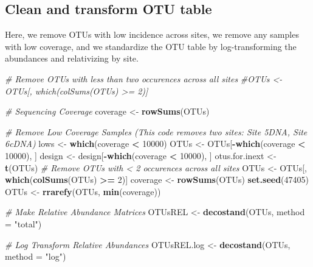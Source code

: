 \documentclass[]{article}
\newenvironment{Shaded}{\begin{snugshade}}{\end{snugshade}}
\newcommand{\KeywordTok}[1]{\textcolor[rgb]{0.13,0.29,0.53}{\textbf{#1}}}
\newcommand{\DataTypeTok}[1]{\textcolor[rgb]{0.13,0.29,0.53}{#1}}
\newcommand{\DecValTok}[1]{\textcolor[rgb]{0.00,0.00,0.81}{#1}}
\newcommand{\StringTok}[1]{\textcolor[rgb]{0.31,0.60,0.02}{#1}}
\newcommand{\CommentTok}[1]{\textcolor[rgb]{0.56,0.35,0.01}{\textit{#1}}}
\newcommand{\OperatorTok}[1]{\textcolor[rgb]{0.81,0.36,0.00}{\textbf{#1}}}
\newcommand{\NormalTok}[1]{#1}
\begin{document}
\subsection{Clean and transform OTU
table}\label{clean-and-transform-otu-table}

Here, we remove OTUs with low incidence across sites, we remove any
samples with low coverage, and we standardize the OTU table by
log-transforming the abundances and relativizing by site.

\begin{Shaded}
\begin{Highlighting}[]
\CommentTok{# Remove OTUs with less than two occurences across all sites}
\CommentTok{#OTUs <- OTUs[, which(colSums(OTUs) >= 2)]}

\CommentTok{# Sequencing Coverage}
\NormalTok{coverage <-}\StringTok{ }\KeywordTok{rowSums}\NormalTok{(OTUs)}

\CommentTok{# Remove Low Coverage Samples (This code removes two sites: Site 5DNA, Site 6cDNA)}
\NormalTok{lows <-}\StringTok{ }\KeywordTok{which}\NormalTok{(coverage }\OperatorTok{<}\StringTok{ }\DecValTok{10000}\NormalTok{)}
\NormalTok{OTUs <-}\StringTok{ }\NormalTok{OTUs[}\OperatorTok{-}\KeywordTok{which}\NormalTok{(coverage }\OperatorTok{<}\StringTok{ }\DecValTok{10000}\NormalTok{), ]}
\NormalTok{design <-}\StringTok{ }\NormalTok{design[}\OperatorTok{-}\KeywordTok{which}\NormalTok{(coverage }\OperatorTok{<}\StringTok{ }\DecValTok{10000}\NormalTok{), ]}
\NormalTok{otus.for.inext <-}\StringTok{  }\KeywordTok{t}\NormalTok{(OTUs)}
\CommentTok{# Remove OTUs with < 2 occurences across all sites}
\NormalTok{OTUs <-}\StringTok{ }\NormalTok{OTUs[, }\KeywordTok{which}\NormalTok{(}\KeywordTok{colSums}\NormalTok{(OTUs) }\OperatorTok{>=}\StringTok{ }\DecValTok{2}\NormalTok{)]}
\NormalTok{coverage <-}\StringTok{ }\KeywordTok{rowSums}\NormalTok{(OTUs)}
\KeywordTok{set.seed}\NormalTok{(}\DecValTok{47405}\NormalTok{)}
\NormalTok{OTUs <-}\StringTok{ }\KeywordTok{rrarefy}\NormalTok{(OTUs, }\KeywordTok{min}\NormalTok{(coverage))}

\CommentTok{# Make Relative Abundance Matrices}
\NormalTok{OTUsREL <-}\StringTok{ }\KeywordTok{decostand}\NormalTok{(OTUs, }\DataTypeTok{method =} \StringTok{"total"}\NormalTok{)}

\CommentTok{# Log Transform Relative Abundances}
\NormalTok{OTUsREL.log <-}\StringTok{ }\KeywordTok{decostand}\NormalTok{(OTUs, }\DataTypeTok{method =} \StringTok{"log"}\NormalTok{)}
\end{Highlighting}
\end{Shaded}
\end{document}
